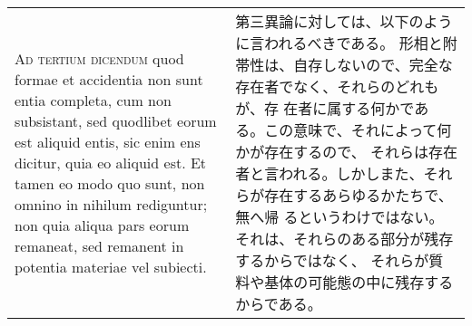 \documentclass[10pt]{jsarticle} %
\begin{document}
\begin{longtable}{p{21em}p{21em}}
\\


{\scshape Ad tertium dicendum} quod formae et
accidentia non sunt entia completa, cum non subsistant, sed quodlibet
eorum est aliquid entis, sic enim ens dicitur, quia eo aliquid est. Et
tamen eo modo quo sunt, non omnino in nihilum rediguntur; non quia
aliqua pars eorum remaneat, sed remanent in potentia materiae vel
subiecti.

&

第三異論に対しては、以下のように言われるべきである。
形相と附帯性は、自存しないので、完全な存在者でなく、それらのどれもが、存
 在者に属する何かである。この意味で、それによって何かが存在するので、
 それらは存在者と言われる。しかしまた、それらが存在するあらゆるかたちで、無へ帰
 るというわけではない。それは、それらのある部分が残存するからではなく、
 それらが質料や基体の可能態の中に残存するからである。


\end{longtable}
\newpage
\end{document}
